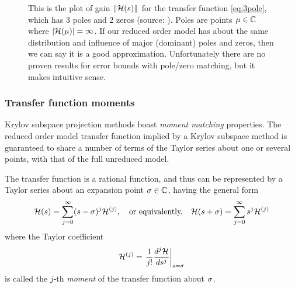 \begin{figure}[hbtp]
\centering
{}
\caption{This is the plot of gain $\| \mathcal{H}(s) \|$ for the transfer function 
\eqref{eq:3pole}, which has 3 poles and 2 zeros (source: \cite{swarth_pole_zero}).  Poles are points $\mu\in\mathbb{C}$ where $| \mathcal{H}(\mu)| = \infty$.   If our reduced order model has about the same distribution and influence of major (dominant) poles and zeros, then we can say it is a good approximation.  Unfortunately there are no proven results for error bounds with pole/zero matching, but it makes intuitive sense.}
\label{fig:swarth_pole}
\end{figure}





\subsubsection{Transfer function moments}        \label{sec:moments}

Krylov subspace projection methods boast \emph{moment matching} properties.  The reduced order model transfer function implied by a Krylov subspace method is guaranteed to share a number of  terms of the Taylor series about one or several points, with that of the full unreduced model.  

\smallskip
The transfer function is a rational function, and thus can be represented by a Taylor series about an expansion point $\sigma\in\mathbb{C}$, having the general form 
\begin{equation}
                \mathcal{H}(s) = \sum_{j=0}^\infty (s-\sigma )^j \mathcal{H}^{(j)},  \quad \text{or equivalently,}\quad
  \mathcal{H}(s+\sigma) = \sum_{j=0}^\infty s^j \mathcal{H}^{(j)}
                \label{eq:tfunc_taylor}
        \end{equation}
        where the Taylor coefficient 
\begin{equation}
\mathcal{H}^{(j)} =\left. \dfrac{1}{j !}\dfrac{d^j \mathcal{H}}{d s^j}\right|_{s=\sigma}
\label{eq:moment_def}
\end{equation}
is called the $j$-th \emph{moment} of the transfer function about $\sigma$.



